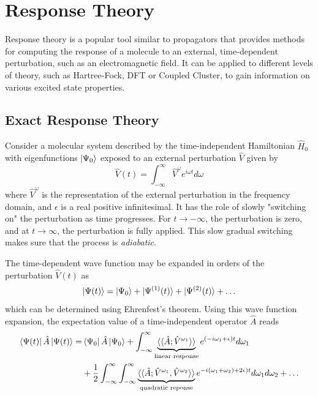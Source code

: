 \section{Response Theory}

Response theory is a popular tool similar to propagators that provides methods for computing the response of a molecule to an external, time-dependent perturbation, such as an electromagnetic field. It can be applied to different levels of theory, such as Hartree-Fock, DFT or Coupled Cluster, to gain information on various excited state properties.

\subsection{Exact Response Theory}

Consider a molecular system described by the time-independent Hamiltonian $\hat{H}_0$ with eigenfunctions $\ket{\Psi_0}$ exposed to
an external perturbation $\hat{V}$ given by \cite{Koc1990}
\begin{equation}
\hat{V}(t) = \int_{-\infty}^{\infty} \hat{V}^{\omega} e^{i\omega t  } d\omega
\end{equation}
\noindent where $\hat{V}^{\omega}$ is the representation of the external perturbation in the frequency domain, and $\epsilon$ is a real positive infinitesimal. It has the role of slowly "switching on" the perturbation as time progresses. For $t\rightarrow -\infty$, the perturbation is zero, and at $t \rightarrow \infty$, the perturbation is fully applied. This slow gradual switching makes sure that the process is \emph{adiabatic}.

The time-dependent wave function may be expanded in orders of the perturbation $\hat{V}(t)$ as
\begin{equation}
\ket{\smash{\Psi (t)}} = \ket{\smash{\Psi_0}} + \ket{\smash{\Psi^{(1)}(t)}} + \ket{\smash{\Psi^{(2)}(t)}} + \ldots
\end{equation}
\noindent which can be determined using Ehrenfest's theorem. Using this wave function expansion, the expectation value of a time-independent operator $\hat{A}$ reads
\begin{equation}
\begin{split}
\bra{\smash{\Psi (t)}} \hat{A} \ket{\smash{\Psi (t)}} = & \bra{\smash{\Psi_0}} \hat{A} \ket{\smash{\Psi_0}} + \int_{-\infty}^{\infty} 
\underbrace{ \langle\langle \hat{A}; \hat{V}^{\omega_1}
\rangle\rangle}_{\text{linear response}} 
e^{(-i\omega_1 + \epsilon)t} d\omega_1 \\
&+ \frac{1}{2} \int_{-\infty}^{\infty} \int_{-\infty}^{\infty}
\underbrace{ \langle\langle \hat{A}; \hat{V}^{\omega_1},\hat{V}^{\omega_2} \rangle\rangle 
}_{\text{quadratic reponse}}
e^{-i(\omega_1+\omega_2) + 2\epsilon)t} d\omega_1 d\omega_2  + \ldots
\end{split}
\label{eq:TIMEEXP}
\end{equation}

